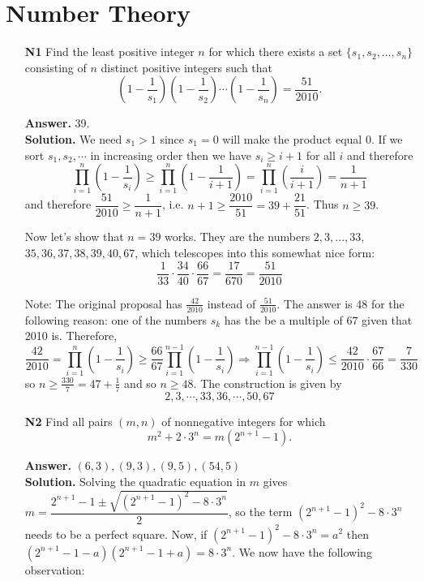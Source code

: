 \documentclass[11pt]{article}
\newcommand{\<}{\langle}
\renewcommand{\>}{\rangle}
\begin{document}
\section*{Number Theory}
\begin{enumerate}
	\item [\textbf{N1}] Find the least positive integer $n$ for which there exists a set $\{s_1, s_2, \ldots , s_n\}$ consisting of $n$ distinct positive integers such that
	\[ \left( 1 - \frac{1}{s_1} \right) \left( 1 - \frac{1}{s_2} \right) \cdots \left( 1 - \frac{1}{s_n} \right) = \frac{51}{2010}.\]
	
	\textbf{Answer.} 39. \\
	\textbf{Solution.} We need $s_1>1$ since $s_1=0$ will make the product equal 0. If we sort $s_1, s_2, \cdots$ in increasing order then we have $s_i\ge i+1$ for all $i$ and therefore 
	\[
	\displaystyle\prod_{i=1}^n \left(1-\frac {1}{s_i}\right)
	\ge \displaystyle\prod_{i=1}^n\left(1-\frac {1}{i+1}\right)
	=\displaystyle\prod_{i=1}^n\left(\frac {i}{i+1}\right)
	=\dfrac{1}{n+1}
	\]
	and therefore $\dfrac{51}{2010}\ge \dfrac{1}{n+1}$, i.e. $n+1\ge \dfrac{2010}{51}=39+\dfrac{21}{51}$. Thus $n\ge 39$. 
	
	Now let's show that $n=39$ works. They are the numbers $2, 3, ..., 33$, $35, 36, 37, 38, 39, 40, 67$, which telescopes into this somewhat nice form: 
	\[\frac {1}{33}\cdot\frac{34}{40}\cdot\frac{66}{67}=\frac{17}{670}=\frac{51}{2010}
	\]
	
	Note: The original proposal has $\frac{42}{2010}$ instead of $\frac{51}{2010}$. 
	The answer is 48 for the following reason: one of the numbers $s_k$ has the be a multiple of $67$ given that 2010 is. Therefore, 
	\[
	\frac{42}{2010}
	=
	\displaystyle\prod_{i=1}^n \left(1-\frac {1}{s_i}\right)
	\ge \frac{66}{67}\displaystyle\prod_{i=1}^{n-1} \left(1-\frac {1}{s_{i}}\right) 
	\Rightarrow
	\displaystyle\prod_{i=1}^{n-1} \left(1-\frac {1}{s_{i}}\right) 
	\le \frac{42}{2010}\cdot\frac{67}{66}
	=\frac{7}{330}
	\]
	so $n\ge \frac{330}{7}=47+\frac{1}{7}$ and so $n\ge 48$. 
	The construction is given by 
	\[
	2, 3, \cdots, 33, 36, \cdots, 50, 67
	\]
	
	\item [\textbf{N2}] Find all pairs $(m,n)$ of nonnegative integers for which \[m^2 + 2 \cdot 3^n = m\left(2^{n+1} - 1\right).\]
	
	\textbf{Answer.} $(6, 3), (9, 3), (9, 5), (54, 5)$\\
	\textbf{Solution.} Solving the quadratic equation in $m$ gives $m=\dfrac{2^{n+1}-1 \pm \sqrt{(2^{n+1}-1)^2 - 8\cdot 3^n}}{2}$, so the term $(2^{n+1}-1)^2 - 8\cdot 3^n$ needs to be a perfect square. Now, if $(2^{n+1}-1)^2 - 8\cdot 3^n = a^2$ then $(2^{n+1}-1-a)(2^{n+1}-1+a)=8\cdot 3^n$. We now have the following observation: 
	

\end{enumerate}
\end{document}
